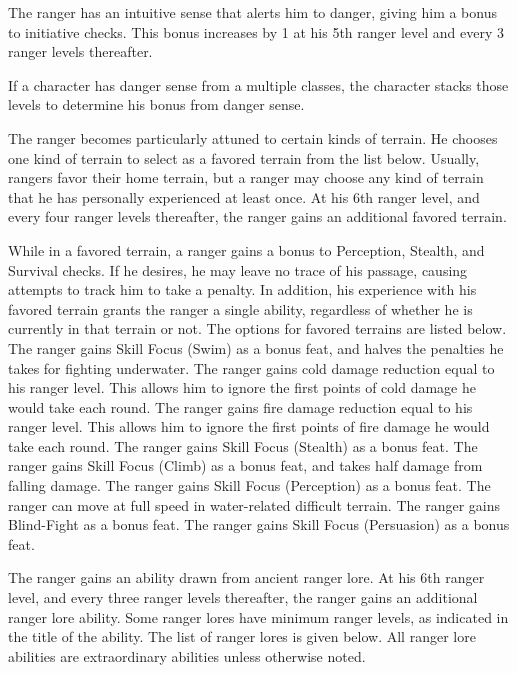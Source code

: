  The ranger has an intuitive sense that alerts him to danger, giving him a  bonus to initiative checks. This bonus increases by 1 at his 5th ranger level and every 3 ranger levels thereafter.
\par If a character has danger sense from a multiple classes, the character stacks those levels to determine his bonus from danger sense.

 The ranger becomes particularly attuned to certain kinds of terrain. He chooses one kind of terrain to select as a favored terrain from the list below. Usually, rangers favor their home terrain, but a ranger may choose any kind of terrain that he has personally experienced at least once. At his 6th ranger level, and every four ranger levels thereafter, the ranger gains an additional favored terrain.
\par While in a favored terrain, a ranger gains a  bonus to Perception, Stealth, and Survival checks. If he desires, he may leave no trace of his passage, causing attempts to track him to take a  penalty. In addition, his experience with his favored terrain grants the ranger a single ability, regardless of whether he is currently in that terrain or not. The options for favored terrains are listed below.
 The ranger gains Skill Focus (Swim) as a bonus feat, and halves the penalties he takes for fighting underwater.
 The ranger gains cold damage reduction equal to his ranger level. This allows him to ignore the first points of cold damage he would take each round.
 The ranger gains fire damage reduction equal to his ranger level. This allows him to ignore the first points of fire damage he would take each round.
 The ranger gains Skill Focus (Stealth) as a bonus feat.
 The ranger gains Skill Focus (Climb) as a bonus feat, and takes half damage from falling damage.
 The ranger gains Skill Focus (Perception) as a bonus feat.
 The ranger can move at full speed in water-related difficult terrain.
 The ranger gains Blind-Fight as a bonus feat.
 The ranger gains Skill Focus (Persuasion) as a bonus feat.

 The ranger gains an ability drawn from ancient ranger lore. At his 6th ranger level, and every three ranger levels thereafter, the ranger gains an additional ranger lore ability. Some ranger lores have minimum ranger levels, as indicated in the title of the ability. The list of ranger lores is given below. All ranger lore abilities are extraordinary abilities unless otherwise noted.

